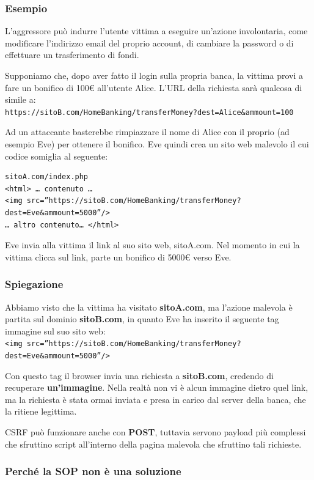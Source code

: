 \documentclass{article}
\begin{document}
\subsubsection{Esempio}

 L'aggressore può indurre l'utente vittima a eseguire un'azione involontaria, come modificare l'indirizzo email del proprio account, di cambiare la password o di effettuare un trasferimento di fondi.

Supponiamo che, dopo aver fatto il login sulla propria banca, la vittima provi a fare un bonifico di 100€ all’utente Alice. L’URL della richiesta sarà qualcosa di simile a:\\
\verb|https://sitoB.com/HomeBanking/transferMoney?dest=Alice&ammount=100|

Ad un attaccante basterebbe rimpiazzare il nome di Alice con il proprio (ad esempio Eve) per ottenere il bonifico. Eve quindi crea un sito web malevolo il cui codice somiglia al seguente:

\begin{verbatim}
sitoA.com/index.php
<html> … contenuto …
<img src=”https://sitoB.com/HomeBanking/transferMoney?dest=Eve&ammount=5000”/>
… altro contenuto… </html>
\end{verbatim}
Eve invia alla vittima il link al suo sito web, sitoA.com. Nel momento in cui la vittima clicca sul link, parte un bonifico di 5000€ verso Eve.

\subsubsection{Spiegazione}

Abbiamo visto che la vittima ha visitato \textbf{sitoA.com}, ma l’azione malevola è partita sul dominio \textbf{sitoB.com}, in quanto Eve ha inserito il seguente tag immagine sul suo sito web:\\
\verb|<img src=”https://sitoB.com/HomeBanking/transferMoney?dest=Eve&ammount=5000”/>|

Con questo tag il browser invia una richiesta a \textbf{sitoB.com}, credendo di recuperare \textbf{un'immagine}. Nella realtà non vi è alcun immagine dietro quel link, ma la richiesta è stata ormai inviata e presa in carico dal server della banca, che la ritiene legittima.

CSRF può funzionare anche con \textbf{POST}, tuttavia servono payload più complessi che sfruttino script all'interno della pagina malevola che sfruttino tali richieste.

\subsubsection{Perché la SOP non è una soluzione}
\end{document}
